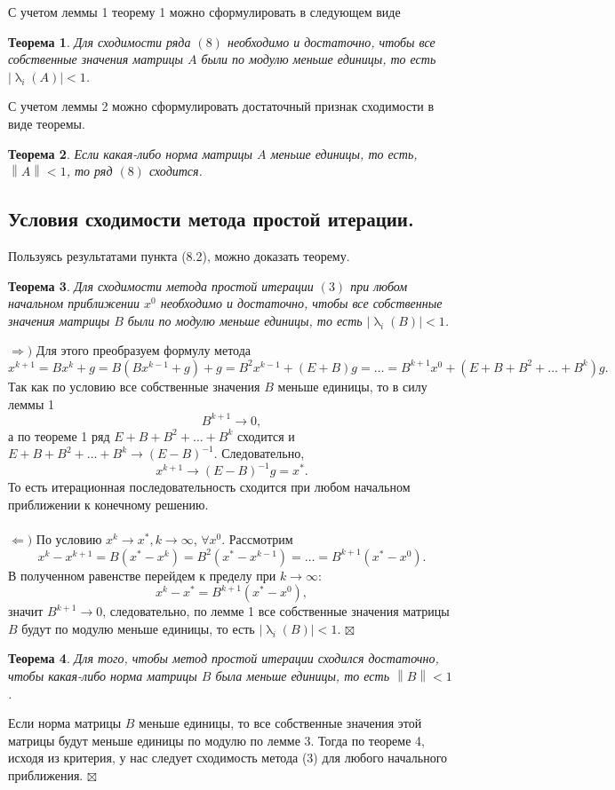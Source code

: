 \documentclass[a4paper, 12pt]{report}
\newenvironment{Proof} %
{\par\noindent{$\blacklozenge$}} %
{\hfill$\scriptstyle\boxtimes$}
\renewcommand{\lambda}{\uplambda}
\newcommand\Norm[1]{\left\| #1 \right\|}
\newtheorem*{theorem}{Теорема}
\begin{document}
 С учетом леммы 1 теорему 1 можно сформулировать в следующем виде
 \begin{theorem}
 	Для сходимости ряда $(8)$ необходимо и достаточно, чтобы все собственные значения матрицы $A$ были по модулю меньше единицы, то есть $|\lambda_i(A)| < 1$.
 \end{theorem}
 С учетом леммы 2 можно сформулировать достаточный признак сходимости в виде теоремы.
 \begin{theorem}
 	Если какая-либо норма матрицы $A$ меньше единицы, то есть, $\Norm{A} < 1$, то ряд $(8)$ сходится.
 \end{theorem}
 \subsection{Условия сходимости метода простой итерации.}
	Пользуясь результатами пункта (8.2), можно доказать теорему.
	\begin{theorem}
		Для сходимости метода простой итерации $(3)$ при любом начальном приближении $x^0$ необходимо и достаточно, чтобы все собственные значения матрицы $B$ были по модулю меньше единицы, то есть $|\lambda_i(B)| < 1$.
	\end{theorem}
	\begin{Proof}
		$\Rightarrow)$ Для этого преобразуем формулу метода $$x^{k+1} = Bx^k + g = B(Bx^{k-1} + g) + g = B^2x^{k-1} + (E+B)g = \ldots = B^{k+1}x^0 + (E+B+B^2 + \ldots + B^k)g.$$
		Так как по условию все собственные значения $B$ меньше единицы, то в силу леммы 1 $$B^{k+1}\to 0,$$ а по теореме 1 ряд $E+B+B^2 + \ldots + B^k$ сходится и $E+B+B^2 + \ldots + B^k \to (E-B)^{-1}$. Следовательно, $$x^{k+1}\to (E-B)^{-1}g = x^*.$$
		То есть итерационная последовательность сходится при любом начальном приближении к конечному решению.\\\\
		$\Leftarrow)$ По условию $x^k \to x^*, k\to \infty$, $\forall x^0$. Рассмотрим $$x^k - x^{k+1}=B(x^* - x^k) = B^2(x^* - x^{k-1}) = \ldots = B^{k+1}(x^* - x^0).$$
		В полученном равенстве перейдем к пределу при $k\to \infty$:
		$$x^k - x^* = B^{k+1}(x^* - x^0),$$ значит $B^{k+1}\to 0$, следовательно, по лемме 1 все собственные значения матрицы $B$ будут по модулю меньше единицы, то есть $|\lambda_i(B)|<1$.
	\end{Proof}
	\begin{theorem}
		Для того, чтобы метод простой итерации сходился достаточно, чтобы какая-либо норма матрицы $B$ была меньше единицы, то есть $\Norm{B}<1$.
	\end{theorem}\begin{Proof}
	Если норма матрицы $B$ меньше единицы, то все собственные значения этой матрицы будут меньше единицы по модулю по лемме 3. Тогда по теореме 4, исходя из критерия, у нас следует сходимость метода (3) для любого начального приближения.
	\end{Proof}
\end{document}

